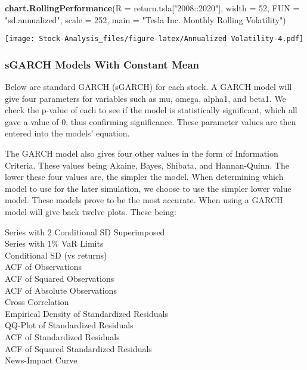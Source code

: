 \documentclass[
]{article}
\newenvironment{Shaded}{\begin{snugshade}}{\end{snugshade}}
\newcommand{\DataTypeTok}[1]{\textcolor[rgb]{0.13,0.29,0.53}{#1}}
\newcommand{\DecValTok}[1]{\textcolor[rgb]{0.00,0.00,0.81}{#1}}
\newcommand{\KeywordTok}[1]{\textcolor[rgb]{0.13,0.29,0.53}{\textbf{#1}}}
\newcommand{\NormalTok}[1]{#1}
\newcommand{\StringTok}[1]{\textcolor[rgb]{0.31,0.60,0.02}{#1}}
\begin{document}
\begin{Shaded}
\begin{Highlighting}[]
\KeywordTok{chart.RollingPerformance}\NormalTok{(}\DataTypeTok{R =}\NormalTok{ return.tsla[}\StringTok{"2008::2020"}\NormalTok{],}
                         \DataTypeTok{width =} \DecValTok{52}\NormalTok{,}
                         \DataTypeTok{FUN =} \StringTok{"sd.annualized"}\NormalTok{,}
                         \DataTypeTok{scale =} \DecValTok{252}\NormalTok{,}
                         \DataTypeTok{main =} \StringTok{"Tesla Inc. Monthly Rolling Volatility"}\NormalTok{)}
\end{Highlighting}
\end{Shaded}

\texttt{[image: Stock-Analysis\_files/figure-latex/Annualized Volatility-4.pdf]}

\hypertarget{sgarch-models-with-constant-mean}{%
\subsubsection{sGARCH Models With Constant
Mean}\label{sgarch-models-with-constant-mean}}

Below are standard GARCH (sGARCH) for each stock. A GARCH model will
give four parameters for variables such as mu, omega, alpha1, and beta1.
We check the p-value of each to see if the model is statistically
significant, which all gave a value of 0, thus confirming significance.
These parameter values are then entered into the models' equation.

The GARCH model also gives four other values in the form of Information
Criteria. These values being Akaine, Bayes, Shibata, and Hannan-Quinn.
The lower these four values are, the simpler the model. When determining
which model to use for the later simulation, we choose to use the
simpler lower value model. These models prove to be the most accurate.
When using a GARCH model will give back twelve plots. These being:

Series with 2 Conditional SD Superimposed\\
Series with 1\% VaR Limits\\
Conditional SD (vs \textbar returns\textbar)\\
ACF of Observations\\
ACF of Squared Observations\\
ACF of Absolute Observations\\
Cross Correlation\\
Empirical Density of Standardized Residuals\\
QQ-Plot of Standardized Residuals\\
ACF of Standardized Residuals\\
ACF of Squared Standardized Residuals\\
News-Impact Curve
\end{document}
